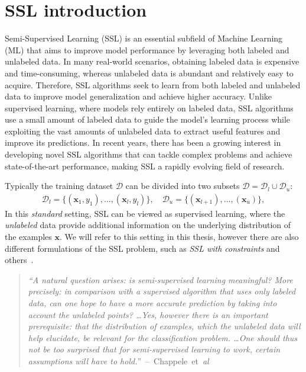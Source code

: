 \section{SSL introduction}
\label{sec:ssl-introduction}
Semi-Supervised Learning (SSL) is an essential subfield of Machine Learning (ML) that aims to improve model performance by leveraging 
both labeled and unlabeled data. In many real-world scenarios, obtaining labeled data is expensive and time-consuming, whereas 
unlabeled data is abundant and relatively easy to acquire. Therefore, SSL algorithms seek to learn from both labeled and unlabeled 
data to improve model generalization and achieve higher accuracy. Unlike supervised learning, where models rely entirely on labeled 
data, SSL algorithms use a small amount of labeled data to guide the model's learning process while exploiting the vast amounts of 
unlabeled data to extract useful features and improve its predictions. In recent years, there has been a growing interest in developing
novel SSL algorithms that can tackle complex problems and achieve state-of-the-art performance, making SSL a rapidly evolving field of 
research. 

Typically the training dataset $\mathcal{D}$ can be divided into two subsets $\mathcal{D} = \mathcal{D}_l \cup \mathcal{D}_u$:
\begin{align*}
    \mathcal{D}_l = \{(\mathbf{x}_1,y_1),\dots, (\mathbf{x}_l,y_l)\},\quad \mathcal{D}_u = \{(\mathbf{x}_{l+1}),\dots,(\mathbf{x}_{u})\},
\end{align*}
In this \textit{standard} setting, SSL can be viewed as supervised learning, where 
the \textit{unlabeled} data provide additional information on the underlying distribution of the examples $\mathbf{x}$.
We will refer to this setting in this thesis, however there are also different formulations of the SSL problem, such as \textit{SSL with constraints}
and others~\cite[p. 1]{ssl-book-2006}.

\begin{quote}
    \textit{
    ``A natural question arises: is semi-supervised learning meaningful? More precisely:
    in comparison with a supervised algorithm that uses only labeled data, can one
    hope to have a more accurate prediction by taking into account the unlabeled
    points? \dots Yes, however there is an important prerequisite: that the
    distribution of examples, which the unlabeled data will help elucidate, be relevant
    for the classification problem.
    \dots One should thus not be too surprised that for semi-supervised learning to work,
    certain assumptions will have to hold.}''~--~Chappele~et~\textit{al}~\cite[p. 4]{ssl-book-2006}
\end{quote}

